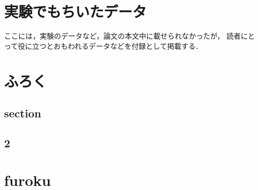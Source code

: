 \chapter{実験でもちいたデータ}

ここには，実験のデータなど，論文の本文中に載せられなかったが，
読者にとって役に立つとおもわれるデータなどを付録として掲載する．

\chapter{ふろく}

\section{section}

\section{2}

\chapter{furoku}

